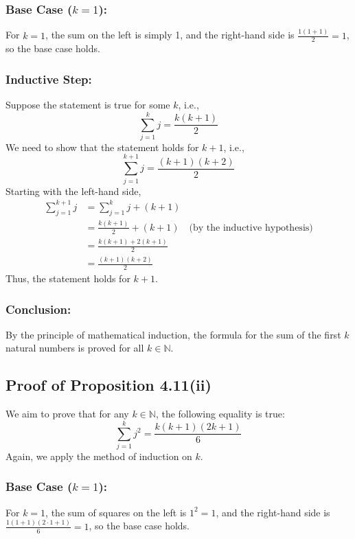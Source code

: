 \documentclass[12pt]{article}
\begin{document}
\subsubsection*{Base Case (\(k=1\)):}
For \( k = 1 \), the sum on the left is simply 1, and the right-hand side is \(\frac{1(1+1)}{2} = 1\), so the base case holds.

\subsubsection*{Inductive Step:}
Suppose the statement is true for some \( k \), i.e.,
\[ \sum_{j=1}^{k} j = \frac{k(k+1)}{2} \]
We need to show that the statement holds for \( k+1 \), i.e.,
\[ \sum_{j=1}^{k+1} j = \frac{(k+1)(k+2)}{2} \]
Starting with the left-hand side,
\begin{align*}
\sum_{j=1}^{k+1} j &= \sum_{j=1}^{k} j + (k+1) \\
                   &= \frac{k(k+1)}{2} + (k+1) \quad \text{(by the inductive hypothesis)}\\
                   &= \frac{k(k+1) + 2(k+1)}{2} \\
                   &= \frac{(k+1)(k+2)}{2}
\end{align*}
Thus, the statement holds for \( k+1 \).

\subsubsection*{Conclusion:}
By the principle of mathematical induction, the formula for the sum of the first \( k \) natural numbers is proved for all \( k \in \mathbb{N} \).

\subsection*{Proof of Proposition 4.11(ii)}

We aim to prove that for any \( k \in \mathbb{N} \), the following equality is true:
\[ \sum_{j=1}^{k} j^2 = \frac{k(k+1)(2k+1)}{6} \]
Again, we apply the method of induction on \( k \).

\subsubsection*{Base Case (\(k=1\)):}
For \( k = 1 \), the sum of squares on the left is \( 1^2 = 1 \), and the right-hand side is \( \frac{1(1+1)(2\cdot1+1)}{6} = 1 \), so the base case holds.
\end{document}
